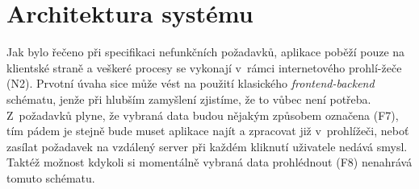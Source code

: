 \documentclass[thesis=B,czech]{FITthesis}[2012/06/26]
\begin{document}

\section{Architektura systému}
Jak bylo řečeno při specifikaci nefunkčních požadavků, aplikace poběží pouze na klientské straně a veškeré procesy se vykonají v~rámci internetového prohlí-žeče (N2). Prvotní úvaha sice může vést na použití klasického \textit{frontend-backend} schématu, jenže při hlubším zamyšlení zjistíme, že to vůbec není potřeba. Z~požadavků plyne, že vybraná data budou nějakým způsobem označena (F7), tím pádem je stejně bude muset aplikace najít a zpracovat již v~prohlížeči, neboť zasílat požadavek na vzdálený server při každém kliknutí uživatele nedává smysl. Taktéž možnost kdykoli si momentálně vybraná data prohlédnout (F8) nenahrává tomuto schématu.
\end{document}
